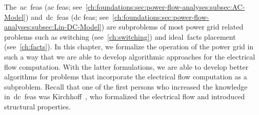 \label{ch:network-analysis}
\glsresetall
%
The~\acrlong{ac}~\acrlong{feas} (\gls{ac} \gls{feas};
see~\cref{ch:foundations:sec:power-flow-analyses:subsec:AC-Model})
and~\acrlong{dc}~\acrlong{feas} (\gls{dc} \gls{feas};
see~\cref{ch:foundations:sec:power-flow-analyses:subsec:Lin-DC-Model}) are
subproblems of most power grid related problems such as switching
(see~\cref{ch:switching}) and ideal~\gls{facts} placement (see~\cref{ch:facts}).
In this chapter, we formalize the operation of the power grid in such a way that
we are able to develop algorithmic approaches for the electrical flow
computation. With the latter formulations, we are able to develop better
algorithms for problems that incorporate the electrical flow computation as a
subproblem. Recall that one of the first persons who increased the knowledge
in~\gls{dc}~\gls{feas} was Kirchhoff~\parencite{Kir47}, who formalized the
electrical flow and introduced structural properties.

